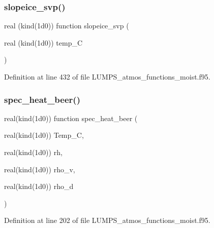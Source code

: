 \subsubsection{\texorpdfstring{slopeice\+\_\+svp()}{slopeice\_svp()}}
{\footnotesize\ttfamily real (kind(1d0)) function slopeice\+\_\+svp (\begin{DoxyParamCaption}\item[{real (kind(1d0))}]{temp\+\_\+C }\end{DoxyParamCaption})}



Definition at line 432 of file L\+U\+M\+P\+S\+\_\+atmos\+\_\+functions\+\_\+moist.\+f95.

\mbox{\label{_l_u_m_p_s__atmos__functions__moist_8f95_ad67fce32939b8349b7af6a3aa30d2d5b}} 
\subsubsection{\texorpdfstring{spec\+\_\+heat\+\_\+beer()}{spec\_heat\_beer()}}
{\footnotesize\ttfamily real(kind(1d0)) function spec\+\_\+heat\+\_\+beer (\begin{DoxyParamCaption}\item[{real(kind(1d0))}]{Temp\+\_\+C,  }\item[{real(kind(1d0))}]{rh,  }\item[{real(kind(1d0))}]{rho\+\_\+v,  }\item[{real(kind(1d0))}]{rho\+\_\+d }\end{DoxyParamCaption})}



Definition at line 202 of file L\+U\+M\+P\+S\+\_\+atmos\+\_\+functions\+\_\+moist.\+f95.

